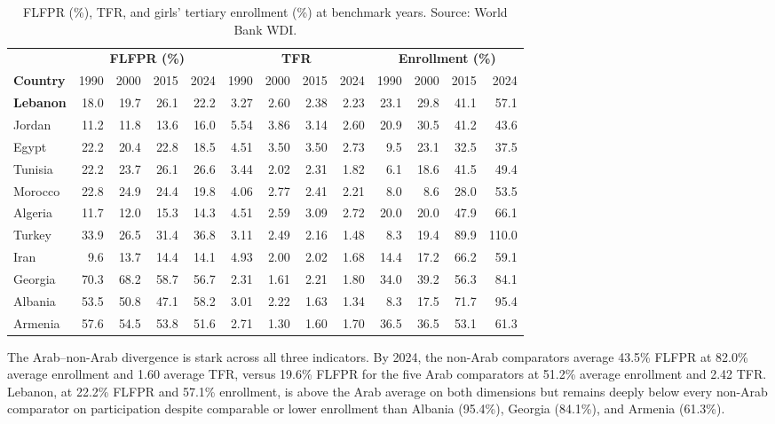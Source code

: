 \documentclass[12pt,a4paper]{article}
\begin{document}
\begin{table}[H]
\centering
\small
\caption{FLFPR (\%), TFR, and girls' tertiary enrollment (\%) at benchmark years. Source: World Bank WDI.}
\label{tab:trends}
\setlength{\tabcolsep}{4pt}
\begin{tabular}{lrrrrrrrrrrrr}
\toprule
& \multicolumn{4}{c}{\textbf{FLFPR (\%)}} & \multicolumn{4}{c}{\textbf{TFR}} & \multicolumn{4}{c}{\textbf{Enrollment (\%)}} \\
\cmidrule(lr){2-5}\cmidrule(lr){6-9}\cmidrule(lr){10-13}
\textbf{Country} & 1990 & 2000 & 2015 & 2024 & 1990 & 2000 & 2015 & 2024 & 1990 & 2000 & 2015 & 2024 \\
\midrule
\textbf{Lebanon}  & 18.0 & 19.7 & 26.1 & 22.2 & 3.27 & 2.60 & 2.38 & 2.23 & 23.1 & 29.8 & 41.1 & 57.1 \\
\midrule
Jordan   & 11.2 & 11.8 & 13.6 & 16.0 & 5.54 & 3.86 & 3.14 & 2.60 & 20.9 & 30.5 & 41.2 & 43.6 \\
Egypt    & 22.2 & 20.4 & 22.8 & 18.5 & 4.51 & 3.50 & 3.50 & 2.73 &  9.5 & 23.1 & 32.5 & 37.5 \\
Tunisia  & 22.2 & 23.7 & 26.1 & 26.6 & 3.44 & 2.02 & 2.31 & 1.82 &  6.1 & 18.6 & 41.5 & 49.4 \\
Morocco  & 22.8 & 24.9 & 24.4 & 19.8 & 4.06 & 2.77 & 2.41 & 2.21 &  8.0 &  8.6 & 28.0 & 53.5 \\
Algeria  & 11.7 & 12.0 & 15.3 & 14.3 & 4.51 & 2.59 & 3.09 & 2.72 & 20.0 & 20.0 & 47.9 & 66.1 \\
\midrule
Turkey   & 33.9 & 26.5 & 31.4 & 36.8 & 3.11 & 2.49 & 2.16 & 1.48 &  8.3 & 19.4 & 89.9 & 110.0\\
Iran     &  9.6 & 13.7 & 14.4 & 14.1 & 4.93 & 2.00 & 2.02 & 1.68 & 14.4 & 17.2 & 66.2 & 59.1 \\
Georgia  & 70.3 & 68.2 & 58.7 & 56.7 & 2.31 & 1.61 & 2.21 & 1.80 & 34.0 & 39.2 & 56.3 & 84.1 \\
Albania  & 53.5 & 50.8 & 47.1 & 58.2 & 3.01 & 2.22 & 1.63 & 1.34 &  8.3 & 17.5 & 71.7 & 95.4 \\
Armenia  & 57.6 & 54.5 & 53.8 & 51.6 & 2.71 & 1.30 & 1.60 & 1.70 & 36.5 & 36.5 & 53.1 & 61.3 \\
\bottomrule
\end{tabular}
\end{table}

The Arab--non-Arab divergence is stark across all three indicators. By 2024, the non-Arab comparators average 43.5\% FLFPR at 82.0\% average enrollment and 1.60 average TFR, versus 19.6\% FLFPR for the five Arab comparators at 51.2\% average enrollment and 2.42 TFR. Lebanon, at 22.2\% FLFPR and 57.1\% enrollment, is above the Arab average on both dimensions but remains deeply below every non-Arab comparator on participation despite comparable or lower enrollment than Albania (95.4\%), Georgia (84.1\%), and Armenia (61.3\%).
\end{document}
